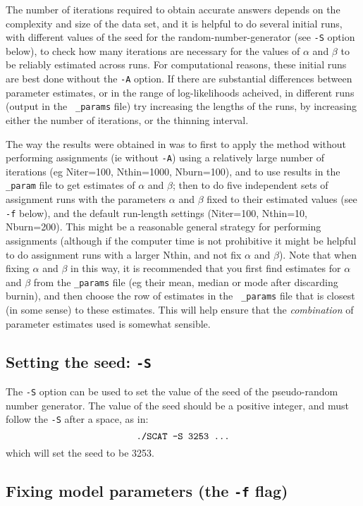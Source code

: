\documentclass[11pt,titlepage,times,letterpaper]{article}
\begin{document}
The number of iterations required to obtain accurate answers depends
on the complexity and size of the data set, and it is helpful to do
several initial runs, with different values of the seed for the
random-number-generator (see {\tt -S} option below), to check how many
iterations are necessary for the values of $\alpha$ and $\beta$ to be
reliably estimated across runs. For computational reasons, these
initial runs are best done without the {\tt -A} option.  If there are
substantial differences between parameter estimates, or in the range
of log-likelihoods acheived, in different runs (output in the {\tt
\_params} file) try increasing the lengths of the runs, by increasing
either the number of iterations, or the thinning interval.

The way the results were obtained in \cite{wasser.etal.04} was to
first to apply the method without performing assignments (ie without
{\tt -A}) using a relatively large number of iterations (eg
{Niter=100, Nthin=1000, Nburn=100}), and to use results in the {\tt
\_param} file to get estimates of $\alpha$ and $\beta$; then to do
five independent sets of assignment runs with the parameters $\alpha$
and $\beta$ fixed to their estimated values (see {\tt -f} below), and
the default run-length settings (Niter=100, Nthin=10, Nburn=200). This
might be a reasonable general strategy for performing assignments
(although if the computer time is not prohibitive it might be helpful
to do assignment runs with a larger Nthin, and not fix $\alpha$ and
$\beta$). Note that when fixing $\alpha$ and $\beta$ in this way, it
is recommended that you first find estimates for $\alpha$ and $\beta$
from the {\tt \_params} file (eg their mean, median or mode after
discarding burnin), and then choose the row of estimates in the {\tt
\_params} file that is closest (in some sense) to these
estimates. This will help ensure that the {\it combination} of
parameter estimates used is somewhat sensible.


\subsection{Setting the seed: {\tt -S}} \label{Soption}

The {\tt -S} option can be used to set the value of the seed of the
pseudo-random number generator. The value of the seed should be a
positive integer, and must follow the {\tt -S} after a space, as in:
$$\text{{\tt ./SCAT -S 3253 ...}}$$
which will set the seed to be 3253.

\subsection{Fixing model parameters (the {\tt -f} flag)}
\end{document}
